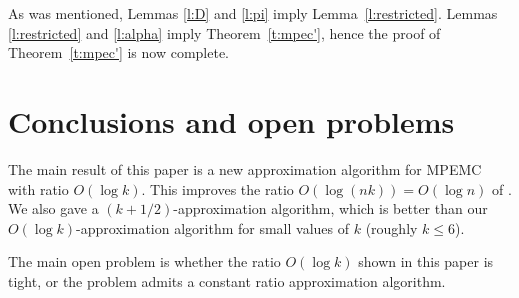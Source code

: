 \documentclass{llncs}
\begin{document}
As was mentioned, Lemmas \ref{l:D} and \ref{l:pi} imply Lemma~\ref{l:restricted}.
Lemmas \ref{l:restricted} and \ref{l:alpha} imply Theorem~\ref{t:mpec'},
hence the proof of Theorem~\ref{t:mpec'} is now complete.

\section{Conclusions and open problems}

The main result of this paper is a new approximation algorithm for {\sf MPEMC}
with ratio $O(\log k)$. This improves the ratio $O(\log(nk))=O(\log n)$ of \cite{KMNT}.
We also gave a $(k+1/2)$-approximation algorithm, which is better than our 
$O(\log k)$-approximation algorithm for small values of $k$ (roughly $k \leq 6$).

The main open problem is whether the ratio $O(\log k)$ shown in this paper
is tight, or the problem admits a constant ratio approximation algorithm. 



\end{document}
